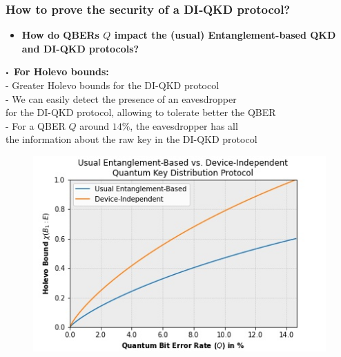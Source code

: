 \documentclass{beamer}
\newcommand\sbullet[1][.5]{\mathbin{\vcenter{\hbox{\scalebox{#1}{$\bullet$}}}}}
\begin{document}
		\begin{frame}
			\frametitle{\large How to prove the security of a DI‑QKD protocol?}

            \vspace{4ex}
            \begin{itemize}
                \item \textbf{How do QBERs $Q$ impact the (usual) Entanglement-based QKD and DI-QKD protocols?}
            \end{itemize}
            
            \begin{minipage}{0.5\textwidth}
                \centering
                \vspace{0.5ex}
                \scriptsize
                $\sbullet$\, \textbf{For Holevo bounds:}\\
                \vspace{0.25ex}
                \tiny
                - Greater Holevo bounds for the DI-QKD protocol\\
                - We can easily detect the presence of an eavesdropper\\for the DI-QKD protocol, allowing to tolerate better the QBER\\
                - For a QBER $Q$ around $14\%$, the eavesdropper has all\\ the information about the raw key in the DI-QKD protocol
                \vspace{-1.2ex}
                \begin{figure}
                    \includegraphics[width=\linewidth]{figures/presentation/jpg/holevo-bounds-quantum-bit-error-rate-plot.jpg}
                    \vspace{-4ex}

\end{figure}
\end{minipage}
\end{frame}
\end{document}
